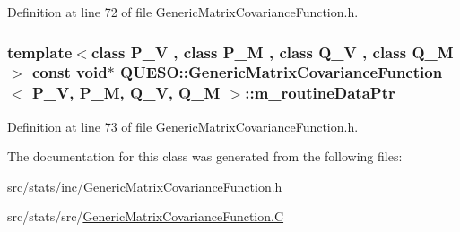 Definition at line 72 of file Generic\-Matrix\-Covariance\-Function.\-h.

\hypertarget{class_q_u_e_s_o_1_1_generic_matrix_covariance_function_a54dbb7157e6a1be651d6467a00d6a8cd}{
\subsubsection[{m\-\_\-routine\-Data\-Ptr}]{\setlength{\rightskip}{0pt plus 5cm}template$<$class P\-\_\-\-V , class P\-\_\-\-M , class Q\-\_\-\-V , class Q\-\_\-\-M $>$ const void$\ast$ {\bf Q\-U\-E\-S\-O\-::\-Generic\-Matrix\-Covariance\-Function}$<$ P\-\_\-\-V, P\-\_\-\-M, Q\-\_\-\-V, Q\-\_\-\-M $>$\-::m\-\_\-routine\-Data\-Ptr\hspace{0.3cm}{\ttfamily [protected]}}}\label{class_q_u_e_s_o_1_1_generic_matrix_covariance_function_a54dbb7157e6a1be651d6467a00d6a8cd}


Definition at line 73 of file Generic\-Matrix\-Covariance\-Function.\-h.



The documentation for this class was generated from the following files\-:\begin{DoxyCompactItemize}
\item 
src/stats/inc/\hyperlink{_generic_matrix_covariance_function_8h}{Generic\-Matrix\-Covariance\-Function.\-h}\item 
src/stats/src/\hyperlink{_generic_matrix_covariance_function_8_c}{Generic\-Matrix\-Covariance\-Function.\-C}\end{DoxyCompactItemize}
